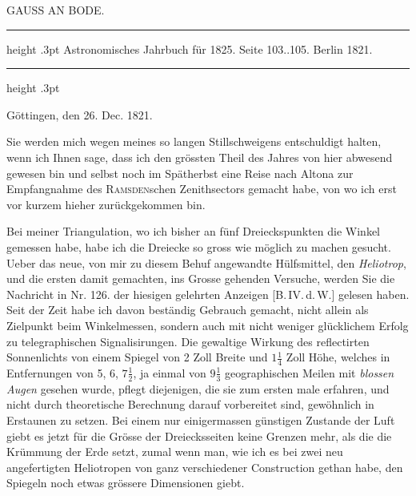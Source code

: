 \par\bigskip
{}
\hypertarget{native-444-part-lower}{}
\begin{center}
{\large GAUSS AN BODE.}
\end{center}
\begin{center}
\parbox{.72\linewidth}{%
\centering\small
\hrule height .3pt\relax\vspace{2.5pt}
Astronomisches Jahrbuch für 1825. Seite 103..105. Berlin 1821.\par
\vspace{2.5pt}\hrule height .3pt\relax
}
\end{center}

\begin{flushright}
Göttingen, den 26. Dec. 1821.
\end{flushright}

Sie werden mich wegen meines so langen Stillschweigens entschuldigt halten, wenn ich Ihnen
sage, dass ich den grössten Theil des Jahres von hier abwesend gewesen bin und selbst noch im Spätherbst eine Reise nach Altona zur Empfangnahme des \textsc{Ramsden}schen Zenithsectors gemacht habe, von
wo ich erst vor kurzem hieher zurückgekommen bin.

Bei meiner Triangulation, wo ich bisher an fünf Dreieckspunkten die Winkel gemessen habe,
habe ich die Dreiecke so gross wie möglich zu machen gesucht. Ueber das neue, von mir zu diesem
Behuf angewandte Hülfsmittel, den \emph{Heliotrop}, und die ersten damit gemachten, ins Grosse gehenden
Versuche, werden Sie die Nachricht in Nr. 126. der hiesigen gelehrten Anzeigen [B.\,IV.\,d.\,W.] gelesen
haben. Seit der Zeit habe ich davon beständig Gebrauch gemacht, nicht allein als Zielpunkt beim Winkelmessen, sondern auch mit nicht weniger glücklichem Erfolg zu telegraphischen Signalisirungen. Die
gewaltige Wirkung des reflectirten Sonnenlichts von einem Spiegel von 2 Zoll Breite und $1\tfrac{1}{4}$ Zoll Höhe,
welches in Entfernungen von 5, 6, $7\tfrac{1}{2}$, ja einmal von $9\tfrac{1}{3}$ geographischen Meilen mit \emph{blossen Augen} gesehen wurde, pflegt diejenigen, die sie zum ersten male erfahren, und nicht durch theoretische Berechnung darauf vorbereitet sind, gewöhnlich in Erstaunen zu setzen. Bei einem nur einigermassen günstigen Zustande der Luft giebt es jetzt für die Grösse der Dreiecksseiten keine Grenzen mehr, als die
die Krümmung der Erde setzt, zumal wenn man, wie ich es bei zwei neu angefertigten Heliotropen von
ganz verschiedener Construction gethan habe, den Spiegeln noch etwas grössere Dimensionen giebt.

